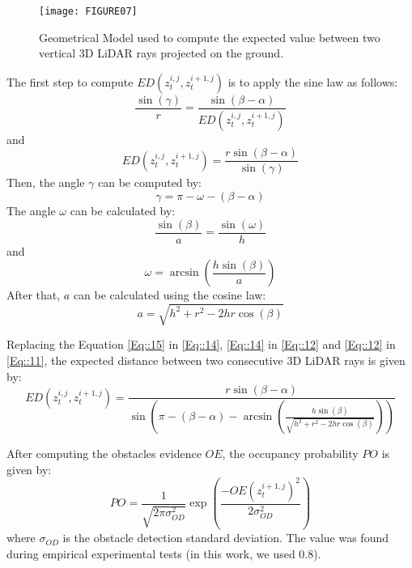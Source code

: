 \begin{figure}[ht]
	\centering
	\texttt{[image: FIGURE07]}
	\caption{Geometrical Model used to compute the expected value between two vertical 3D LiDAR rays projected on the ground.}
	\label{Fig::FIGURE07}
\end{figure}

The first step to compute $ED\left( z_t^{i,j},z_t^{i+1,j}\right) $ is to apply the sine law as follows:
\begin{equation}
\label{Eq::10}
\frac{\sin(\gamma)}{r}=\frac{\sin(\beta-\alpha)}{ED\left( z_t^{i,j},z_t^{i+1,j}\right)}
\end{equation}
and
\begin{equation}
\label{Eq::11}
ED\left( z_t^{i,j},z_t^{i+1,j}\right) = \frac{r\sin(\beta-\alpha)}{\sin(\gamma)}
\end{equation}
Then, the angle $\gamma$ can be computed by:
\begin{equation}
\label{Eq::12}
\gamma = \pi - \omega -(\beta-\alpha)
\end{equation}
The angle $\omega$ can be calculated by:
\begin{equation}
\label{Eq::13}
\frac{\sin(\beta)}{a}=\frac{\sin(\omega)}{h}
\end{equation}
and
\begin{equation}
\label{Eq::14}
\omega = \arcsin \left( \frac{h\sin(\beta)}{a} \right)
\end{equation}
After that, $a$ can be calculated using the cosine law:
\begin{equation}
\label{Eq::15}
a = \sqrt{h^2+r^2-2hr\cos(\beta)}
\end{equation}

Replacing the Equation \ref{Eq::15} in \ref{Eq::14}, \ref{Eq::14} in \ref{Eq::12} and \ref{Eq::12} in \ref{Eq::11}, the expected distance between two consecutive 3D LiDAR rays is given by:
\begin{equation}
\label{Eq::16}
ED\left( z_t^{i,j},z_t^{i+1,j}\right) = \frac{r\sin(\beta-\alpha)}{\sin \left( \pi -(\beta-\alpha) - \arcsin \left( \frac{h\sin(\beta)}{\sqrt{h^2+r^2-2hr\cos(\beta)}} \right) \right)}
\end{equation}

After computing the obstacles evidence $OE$, the occupancy probability $PO$ is given by:
\begin{equation}
\label{Eq::17}
PO = \frac{1}{\sqrt{2\pi\sigma_{OD}^2}}\exp \left( \frac{-OE\left( z_t^{i+1,j} \right)^2}{2\sigma_{OD}^2} \right)
\end{equation}
where $\sigma_{OD}$ is the obstacle detection standard deviation. The value was found during empirical experimental tests (in this work, we used $0.8$).


